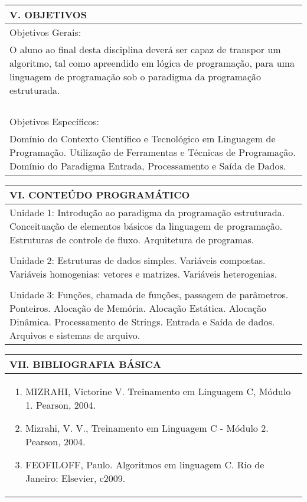 \documentclass[12pt]{article}
\begin{document}
\begin{longtable}{|L{1.025\textwidth}|} \hline
%
{\bf V. OBJETIVOS } \\ \hline
%
Objetivos Gerais:\\
 O aluno ao final desta disciplina deverá ser capaz de transpor um algoritmo, tal como apreendido em lógica de programação, para uma linguagem de programação sob o paradigma da programação estruturada.
\\
\\
\\
\\
\\
Objetivos Específicos: \\
Domínio do Contexto Científico e Tecnológico em Linguagem de Programação. Utilização de Ferramentas e Técnicas de Programação. Domínio do Paradigma Entrada, Processamento e Saída de Dados.

\\ \hline
\end{longtable}


\begin{longtable}{|L{1.025\textwidth}|} \hline
%
{\bf VI. CONTEÚDO PROGRAMÁTICO } \\ \hline
Unidade 1: Introdução ao paradigma da programação estruturada. Conceituação de elementos básicos da linguagem de programação. Estruturas de controle de fluxo. Arquitetura de programas.\\
\\
Unidade 2: Estruturas de dados simples. Variáveis compostas. Variáveis homogenias: vetores e matrizes. Variáveis heterogenias.\\
\\
Unidade 3: Funções, chamada de funções, passagem de parâmetros. Ponteiros. Alocação de Memória. Alocação Estática. Alocação Dinâmica. Processamento de Strings. Entrada e Saída de dados. Arquivos e sistemas de arquivo.

\\ \hline
\end{longtable} 


\begin{longtable}{|L{1.025\textwidth}|} \hline
%
{\bf VII. BIBLIOGRAFIA BÁSICA} \\ \hline
\begin{enumerate}
%
\item MIZRAHI, Victorine V. Treinamento em Linguagem C, Módulo 1. Pearson, 2004. 
\item Mizrahi, V. V., Treinamento em Linguagem C - Módulo 2. Pearson, 2004. 
\item FEOFILOFF, Paulo. Algoritmos em linguagem C. Rio de Janeiro: Elsevier, c2009. 
\end{enumerate}
 \\ \hline
\end{longtable}
\end{document}
